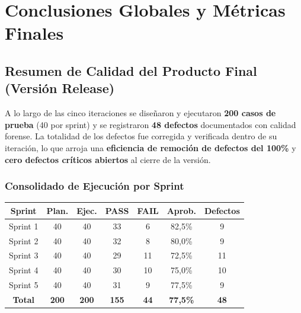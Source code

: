 \chapter{Conclusiones Globales y Métricas Finales}
\label{ch:conclusiones}

\section{Resumen de Calidad del Producto Final (Versión Release)}
\label{sec:concl-resumen}

A lo largo de las cinco iteraciones se diseñaron y ejecutaron \textbf{200 casos de prueba}
(40 por sprint) y se registraron \textbf{48 defectos} documentados con calidad forense. La
totalidad de los defectos fue corregida y verificada dentro de su iteración, lo que arroja
una \textbf{eficiencia de remoción de defectos del 100\%} y \textbf{cero defectos críticos
abiertos} al cierre de la versión.

\subsection{Consolidado de Ejecución por Sprint}

\vspace{0.1cm}
\begin{center}
\renewcommand{\arraystretch}{1.35}
\fontsize{8.5}{10.2}\selectfont\sffamily
\begin{tabular}{|c|c|c|c|c|c|c|}
\hline
\rowcolor{headerTabla}
\sffamily\textbf{Sprint} & \sffamily\textbf{Plan.} & \sffamily\textbf{Ejec.} & \sffamily\textbf{PASS} & \sffamily\textbf{FAIL} & \sffamily\textbf{Aprob.} & \sffamily\textbf{Defectos} \\
\hline
Sprint 1 & 40 & 40 & 33 & 6 & 82,5\% & 9 \\ \hline
\rowcolor{grisTecnico}
Sprint 2 & 40 & 40 & 32 & 8 & 80,0\% & 9 \\ \hline
Sprint 3 & 40 & 40 & 29 & 11 & 72,5\% & 11 \\ \hline
\rowcolor{grisTecnico}
Sprint 4 & 40 & 40 & 30 & 10 & 75,0\% & 10 \\ \hline
Sprint 5 & 40 & 40 & 31 & 9 & 77,5\% & 9 \\ \hline
\rowcolor{headerTabla}
\sffamily\textbf{Total} & \sffamily\textbf{200} & \sffamily\textbf{200} & \sffamily\textbf{155} & \sffamily\textbf{44} & \sffamily\textbf{77,5\%} & \sffamily\textbf{48} \\ \hline
\end{tabular}
\end{center}

